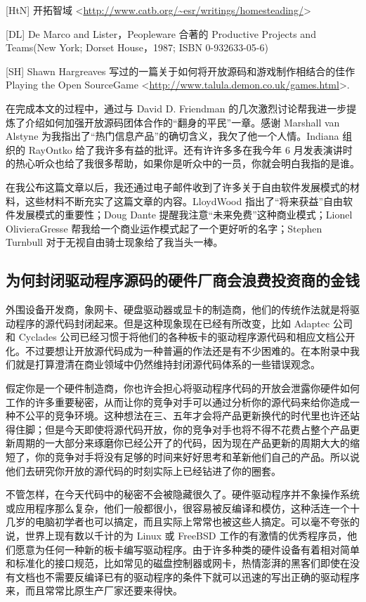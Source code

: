 [HtN] 开拓智域 <\url{http://www.catb.org/~esr/writings/homesteading/}>


[DL] De Marco and Lister，Peopleware 合著的 Productive Projects and Teams(New York; Dorset House，1987; ISBN 0-932633-05-6)


[SH] Shawn Hargreaves 写过的一篇关于如何将开放源码和游戏制作相结合的佳作 Playing the Open SourceGame
<\url{http://www.talula.demon.co.uk/games.html}>.


在完成本文的过程中，通过与 David D. Friendman 的几次激烈讨论帮我进一步提炼了介绍如何加强开放源码团体合作的“翻身的平民”一章。感谢 Marshall van Alstyne 为我指出了“热门信息产品”的确切含义，我欠了他一个人情。Indiana 组织的 RayOntko 给了我许多有益的批评。还有许许多多在我今年 6 月发表演讲时的热心听众也给了我很多帮助，如果你是听众中的一员，你就会明白我指的是谁。


在我公布这篇文章以后，我还通过电子邮件收到了许多关于自由软件发展模式的材料，这些材料不断充实了这篇文章的内容。LloydWood 指出了“将来获益”自由软件发展模式的重要性；Doug Dante 提醒我注意“未来免费”这种商业模式；Lionel OlivieraGresse 帮我给一个商业运作模式起了一个更好听的名字；Stephen Turnbull 对于无视自由骑士现象给了我当头一棒。


\subsection{为何封闭驱动程序源码的硬件厂商会浪费投资商的金钱}
外围设备开发商，象网卡、硬盘驱动器或显卡的制造商，他们的传统作法就是将驱动程序的源代码封闭起来。但是这种现象现在已经有所改变，比如 Adaptec 公司和 Cyclades 公司已经习惯于将他们的各种板卡的驱动程序源代码和相应文档公开化。不过要想让开放源代码成为一种普遍的作法还是有不少困难的。在本附录中我们就是打算澄清在商业领域中仍然维持封闭源代码体系的一些错误观念。


假定你是一个硬件制造商，你也许会担心将驱动程序代码的开放会泄露你硬件如何工作的许多重要秘密，从而让你的竞争对手可以通过分析你的源代码来给你造成一种不公平的竞争环境。这种想法在三、五年才会将产品更新换代的时代里也许还站得住脚；但是今天即使将源代码开放，你的竞争对手也将不得不花费占整个产品更新周期的一大部分来琢磨你已经公开了的代码，因为现在产品更新的周期大大的缩短了，你的竞争对手将没有足够的时间来好好思考和革新他们自己的产品。所以说他们去研究你开放的源代码的时刻实际上已经钻进了你的圈套。


不管怎样，在今天代码中的秘密不会被隐藏很久了。硬件驱动程序并不象操作系统或应用程序那么复杂，他们一般都很小，很容易被反编译和模仿，这种活连一个十几岁的电脑初学者也可以搞定，而且实际上常常也被这些人搞定。可以毫不夸张的说，世界上现有数以千计的为 Linux 或 FreeBSD 工作的有激情的优秀程序员，他们愿意为任何一种新的板卡编写驱动程序。由于许多种类的硬件设备有着相对简单和标准化的接口规范，比如常见的磁盘控制器或网卡，热情澎湃的黑客们即使在没有文档也不需要反编译已有的驱动程序的条件下就可以迅速的写出正确的驱动程序来，而且常常比原生产厂家还要来得快。


